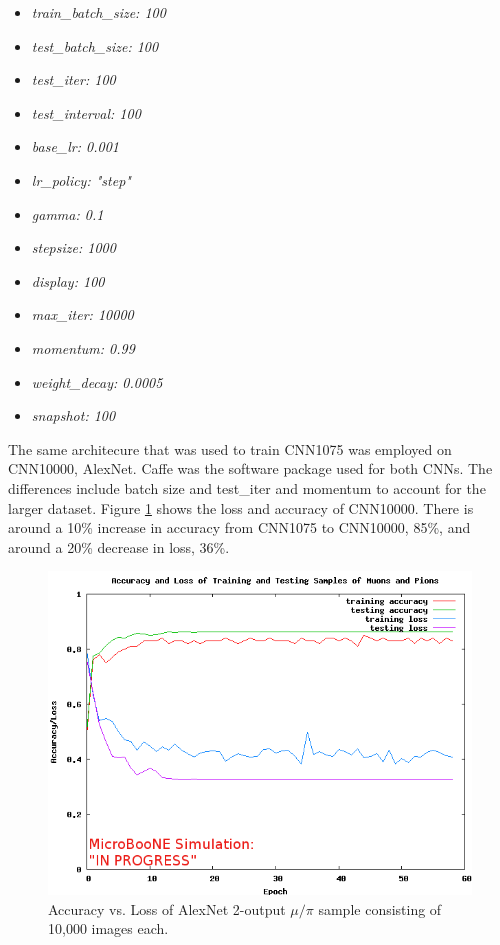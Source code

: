 \begin{multicols}{2}
\begin{itemize}
 \item \textit{train{\_}batch{\_}size: 100}
 \item \textit{test{\_}batch{\_}size: 100}
 \item \textit{test{\_}iter: 100}
 \item \textit{test{\_}interval: 100}
 \item \textit{base{\_}lr: 0.001}
 \item \textit{lr{\_}policy: "step"}
 \item \textit{gamma: 0.1}
 \item \textit{stepsize: 1000}
 \item \textit{display: 100}
 \item \textit{max{\_}iter: 10000}
 \item \textit{momentum: 0.99}
 \item \textit{weight{\_}decay: 0.0005}
 \item \textit{snapshot: 100}
\end{itemize}
\end{multicols}

The same architecure that was used to train CNN1075 was employed on CNN10000, AlexNet. Caffe \cite{caffe} was the software package used for both CNNs. The differences include batch size and test{\_}iter and momentum to account for the larger dataset. Figure \ref{fig:loss_accuracy} shows the loss and accuracy of CNN10000. There is around a 10\% increase in accuracy from CNN1075 to CNN10000, 85\%, and around a 20\% decrease in loss, 36\%.
\begin{figure}[htp!]
\centering
\includegraphics[width=\textwidth]{figs/acc_loss_10000_062117.png}
\caption{Accuracy vs. Loss of AlexNet 2-output $\mu/\pi$ sample consisting of 10,000 images each.} 
\label{fig:loss_accuracy}
\end{figure}

